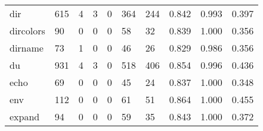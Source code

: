 \begin{longtable}{lp{1.3cm}p{1.3cm}p{1.3cm}p{1.3cm}p{1.3cm}p{1.3cm}p{1.3cm}p{1.3cm}p{1.3cm}}
dir       &                    615 &                                             4 &                                            3 &                                           0 &                                          364 &                                        244 &                                0.842 &                                  0.993 &                                0.397 \\
dircolors &                     90 &                                             0 &                                            0 &                                           0 &                                           58 &                                         32 &                                0.839 &                                  1.000 &                                0.356 \\
dirname   &                     73 &                                             1 &                                            0 &                                           0 &                                           46 &                                         26 &                                0.829 &                                  0.986 &                                0.356 \\
du        &                    931 &                                             4 &                                            3 &                                           0 &                                          518 &                                        406 &                                0.854 &                                  0.996 &                                0.436 \\
echo      &                     69 &                                             0 &                                            0 &                                           0 &                                           45 &                                         24 &                                0.837 &                                  1.000 &                                0.348 \\
env       &                    112 &                                             0 &                                            0 &                                           0 &                                           61 &                                         51 &                                0.864 &                                  1.000 &                                0.455 \\
expand    &                     94 &                                             0 &                                            0 &                                           0 &                                           59 &                                         35 &                                0.843 &                                  1.000 &                                0.372 \\

\end{longtable}
